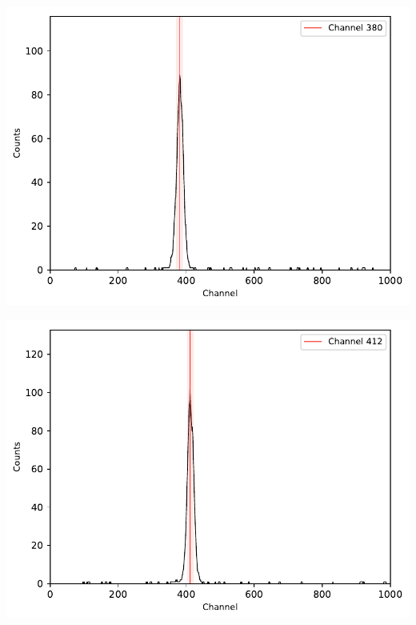 \begin{multicols}{2}
\begin{center}
\begin{adjustbox}{max width=\linewidth, keepaspectratio}
        \end{adjustbox}
        \label{fig:60CoZeitspektrum20ns}
    \end{center}
\endminipage
%
\vspace{10mm}
%
\minipage{\linewidth}
    \begin{center}
        \captionsetup{type=figure}
        \begin{adjustbox}{max width=\linewidth, keepaspectratio}
            \includegraphics[]{pdf/60CoZeitspektrum40ns}
        \end{adjustbox}
        \label{fig:60CoZeitspektrum40ns}
    \end{center}
\endminipage
%
\vspace{10mm}
%
\minipage{\linewidth}
    \begin{center}
        \captionsetup{type=figure}
        \begin{adjustbox}{max width=\linewidth, keepaspectratio}
            \includegraphics[]{pdf/60CoZeitspektrum60ns}

\end{adjustbox}
\end{center}
\end{multicols}
